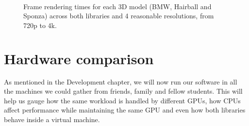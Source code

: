 \begin{figure}
    \\
    \centering
    \caption{Frame rendering times for each 3D model (BMW, Hairball and Sponza) across both libraries and 4 reasonable resolutions, from 720p to 4k.}
    \label{frametimes-overview-graph}
\end{figure}

\section{Hardware comparison}
As mentioned in the Development chapter, we will now run our software in all the machines we could gather from friends, family and fellow students. This will help us gauge how the same workload is handled by different GPUs, how CPUs affect performance while maintaining the same GPU and even how both libraries behave inside a virtual machine.
